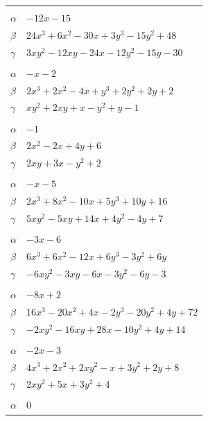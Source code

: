 \documentclass[11pt]{article}
\begin{document}
\begin{longtable}{@{}ll@{}}
\addlinespace[3pt]
\multicolumn{2}{@{}l}{$\{i,j\}=\{50,52\}$, $k_{ij}=3^{2}\cdot 7$}\\
$\alpha$ & $-12x-15$\\
$\beta$ & $24x^{3}+6x^{2}-30x+3y^{3}-15y^{2}+48$\\
$\gamma$ & $3xy^{2}-12xy-24x-12y^{2}-15y-30$\\
\addlinespace[3pt]
\multicolumn{2}{@{}l}{$\{i,j\}=\{50,53\}$, $k_{ij}=3$}\\
$\alpha$ & $-x-2$\\
$\beta$ & $2x^{3}+2x^{2}-4x+y^{3}+2y^{2}+2y+2$\\
$\gamma$ & $xy^{2}+2xy+x-y^{2}+y-1$\\
\addlinespace[3pt]
\multicolumn{2}{@{}l}{$\{i,j\}=\{50,54\}$, $k_{ij}=7$}\\
$\alpha$ & $-1$\\
$\beta$ & $2x^{2}-2x+4y+6$\\
$\gamma$ & $2xy+3x-y^{2}+2$\\
\addlinespace[3pt]
\multicolumn{2}{@{}l}{$\{i,j\}=\{50,59\}$, $k_{ij}=3\cdot 7$}\\
$\alpha$ & $-x-5$\\
$\beta$ & $2x^{3}+8x^{2}-10x+5y^{3}+10y+16$\\
$\gamma$ & $5xy^{2}-5xy+14x+4y^{2}-4y+7$\\
\addlinespace[3pt]
\multicolumn{2}{@{}l}{$\{i,j\}=\{50,60\}$, $k_{ij}=3^{2}$}\\
$\alpha$ & $-3x-6$\\
$\beta$ & $6x^{3}+6x^{2}-12x+6y^{3}-3y^{2}+6y$\\
$\gamma$ & $-6xy^{2}-3xy-6x-3y^{2}-6y-3$\\
\addlinespace[3pt]
\multicolumn{2}{@{}l}{$\{i,j\}=\{50,61\}$, $k_{ij}=2\cdot 3\cdot 7$}\\
$\alpha$ & $-8x+2$\\
$\beta$ & $16x^{3}-20x^{2}+4x-2y^{3}-20y^{2}+4y+72$\\
$\gamma$ & $-2xy^{2}-16xy+28x-10y^{2}+4y+14$\\
\addlinespace[3pt]
\multicolumn{2}{@{}l}{$\{i,j\}=\{50,62\}$, $k_{ij}=7$}\\
$\alpha$ & $-2x-3$\\
$\beta$ & $4x^{3}+2x^{2}+2xy^{2}-x+3y^{2}+2y+8$\\
$\gamma$ & $2xy^{2}+5x+3y^{2}+4$\\
\addlinespace[3pt]
\multicolumn{2}{@{}l}{$\{i,j\}=\{50,92\}$, $k_{ij}=3$}\\
$\alpha$ & $0$\\

\end{longtable}
\end{document}
